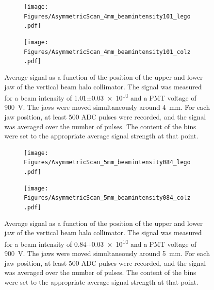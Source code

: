 \begin{figure}
\begin{subfigure}[b]{0.5\textwidth}
\texttt{[image: Figures/AsymmetricScan\_4mm\_beamintensity101\_lego.pdf]}
\end{subfigure}
\begin{subfigure}[b]{0.5\textwidth}
\texttt{[image: Figures/AsymmetricScan\_4mm\_beamintensity101\_colz.pdf]}
\end{subfigure}
\caption[RHUL Cherenkov detector signal for certain upper/lower jaw positions around \SI{4}{\milli\metre}, for a beam intensity of \num{1.01}$\pm$\num{0.03e10}]{Average signal as a function of the position of the upper and lower jaw of the vertical beam halo collimator. The signal was measured for a beam intensity of \num{1.01}$\pm$\num{0.03e10} and a PMT voltage of \SI{900}{\volt}. The jaws were moved simultaneously around \SI{4}{\milli\metre}. For each jaw position, at least 500 ADC pulses were recorded, and the signal was averaged over the number of pulses. The content of the bins were set to the appropriate average signal strength at that point.}
\label{fig:AverageSignal_Asymmetric_4mm_101}
\end{figure}
\begin{figure}
\begin{subfigure}[b]{0.5\textwidth}
\texttt{[image: Figures/AsymmetricScan\_5mm\_beamintensity084\_lego.pdf]}
\end{subfigure}
\begin{subfigure}[b]{0.5\textwidth}
\texttt{[image: Figures/AsymmetricScan\_5mm\_beamintensity084\_colz.pdf]}
\end{subfigure}
\caption[RHUL Cherenkov detector signal for certain upper/lower jaw positions around \SI{5}{\milli\metre}, for a beam intensity of \num{0.84}$\pm$\num{0.03e10}]{Average signal as a function of the position of the upper and lower jaw of the vertical beam halo collimator. The signal was measured for a beam intensity of \num{0.84}$\pm$\num{0.03e10} and a PMT voltage of \SI{900}{\volt}. The jaws were moved simultaneously around \SI{5}{\milli\metre}. For each jaw position, at least 500 ADC pulses were recorded, and the signal was averaged over the number of pulses. The content of the bins were set to the appropriate average signal strength at that point.}
\label{fig:AverageSignal_Asymmetric_5mm_084}
\end{figure}
